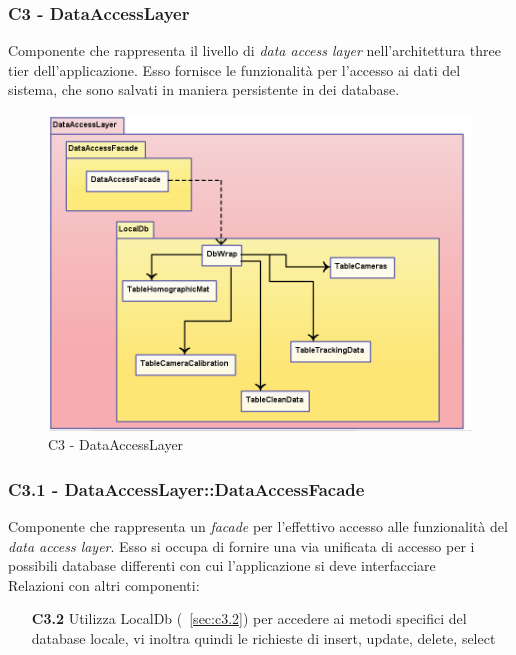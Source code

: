 \subsubsection{C3 - DataAccessLayer} \label{sec:c3}
Componente che rappresenta il livello di \textit{data access layer} nell'architettura three tier dell'applicazione. Esso fornisce le funzionalità per l'accesso ai dati del sistema, che sono salvati in maniera persistente in dei database. 
\\
\begin{figure}[!h] 

        \centering 

        \includegraphics[scale=0.4]{./images/c3.png} 

        \caption{C3 - DataAccessLayer} 

        \label{fig:c3}

        \end{figure} 

\subsubsection{C3.1 - DataAccessLayer::DataAccessFacade} \label{sec:c3.1}
Componente che rappresenta un \textit{facade} per l'effettivo accesso alle funzionalità del \textit{data access layer}. Esso si occupa di fornire una via unificata di accesso per i possibili database differenti con cui l'applicazione si deve interfacciare\\
Relazioni con altri componenti: 
\begin{itemize} 
\item [\textbf{C3.2}]
Utilizza LocalDb (~\ref{sec:c3.2}) per accedere ai metodi specifici del database locale, vi inoltra quindi le richieste di insert, update, delete, select 
\end{itemize} 

